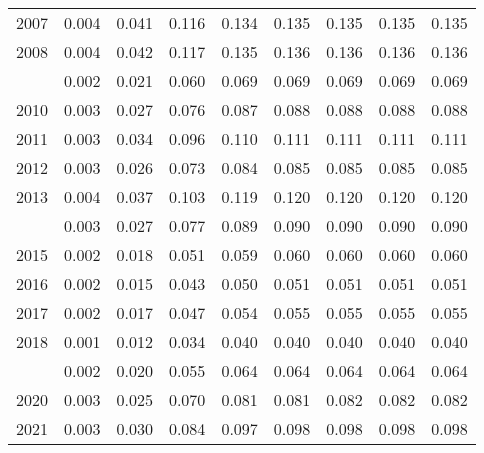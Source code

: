 \documentclass[
]{article}
\begin{document}
\begin{longtable}[t]{lrrrrrrrr}
2007 & 0.004 & 0.041 & 0.116 & 0.134 & 0.135 & 0.135 & 0.135 & 0.135\\
2008 & 0.004 & 0.042 & 0.117 & 0.135 & 0.136 & 0.136 & 0.136 & 0.136\\
\addlinespace
2009 & 0.002 & 0.021 & 0.060 & 0.069 & 0.069 & 0.069 & 0.069 & 0.069\\
2010 & 0.003 & 0.027 & 0.076 & 0.087 & 0.088 & 0.088 & 0.088 & 0.088\\
2011 & 0.003 & 0.034 & 0.096 & 0.110 & 0.111 & 0.111 & 0.111 & 0.111\\
2012 & 0.003 & 0.026 & 0.073 & 0.084 & 0.085 & 0.085 & 0.085 & 0.085\\
2013 & 0.004 & 0.037 & 0.103 & 0.119 & 0.120 & 0.120 & 0.120 & 0.120\\
\addlinespace
2014 & 0.003 & 0.027 & 0.077 & 0.089 & 0.090 & 0.090 & 0.090 & 0.090\\
2015 & 0.002 & 0.018 & 0.051 & 0.059 & 0.060 & 0.060 & 0.060 & 0.060\\
2016 & 0.002 & 0.015 & 0.043 & 0.050 & 0.051 & 0.051 & 0.051 & 0.051\\
2017 & 0.002 & 0.017 & 0.047 & 0.054 & 0.055 & 0.055 & 0.055 & 0.055\\
2018 & 0.001 & 0.012 & 0.034 & 0.040 & 0.040 & 0.040 & 0.040 & 0.040\\
\addlinespace
2019 & 0.002 & 0.020 & 0.055 & 0.064 & 0.064 & 0.064 & 0.064 & 0.064\\
2020 & 0.003 & 0.025 & 0.070 & 0.081 & 0.081 & 0.082 & 0.082 & 0.082\\
2021 & 0.003 & 0.030 & 0.084 & 0.097 & 0.098 & 0.098 & 0.098 & 0.098\\*
\end{longtable}
\end{document}

